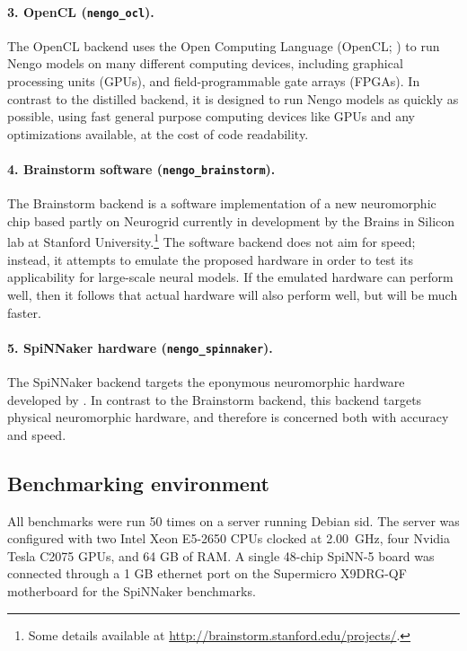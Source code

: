 \documentclass{frontiersSCNS}
\begin{document}
\paragraph{3. OpenCL (\texttt{nengo\_ocl}).}
The OpenCL backend uses the Open Computing Language
(OpenCL; \citealp{stone2010})
to run Nengo models on many different computing devices,
including graphical processing units (GPUs),
and field-programmable gate arrays (FPGAs).
In contrast to the distilled backend,
it is designed to run Nengo models
as quickly as possible,
using fast general purpose computing devices
like GPUs and any optimizations available,
at the cost of code readability.

\paragraph{4. Brainstorm software (\texttt{nengo\_brainstorm}).}
The Brainstorm backend is a software implementation
of a new neuromorphic chip
based partly on Neurogrid \citep{benjamin2014}
currently in development
by the Brains in Silicon lab
at Stanford University.\footnote{
  Some details available at \url{http://brainstorm.stanford.edu/projects/}.}
The software backend does not aim for speed;
instead, it attempts to emulate the proposed hardware
in order to test its applicability
for large-scale neural models.
If the emulated hardware can perform well,
then it follows that actual hardware
will also perform well,
but will be much faster.

\paragraph{5. SpiNNaker hardware (\texttt{nengo\_spinnaker}).}
The SpiNNaker backend \citep{mundy2015}
targets the eponymous neuromorphic hardware
developed by \citet{furber2014}.
In contrast to the Brainstorm backend,
this backend targets physical neuromorphic hardware,
and therefore is concerned
both with accuracy and speed.

\subsection{Benchmarking environment}

All benchmarks were run 50 times
on a server running Debian sid.
The server was configured with
two Intel Xeon E5-2650 CPUs
clocked at 2.00~GHz,
four Nvidia Tesla C2075 GPUs,
and 64 GB of RAM.
A single 48-chip SpiNN-5 board
was connected through
a 1 GB ethernet port on
the Supermicro X9DRG-QF motherboard
for the SpiNNaker benchmarks.
\end{document}
